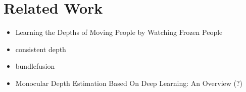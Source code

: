 \chapter{Related Work}
    \begin{itemize}
        \item Learning the Depths of Moving People by Watching Frozen People
        \item consistent depth
        \item bundlefusion
        \item Monocular Depth Estimation Based On Deep
        Learning: An Overview (?)
    \end{itemize}